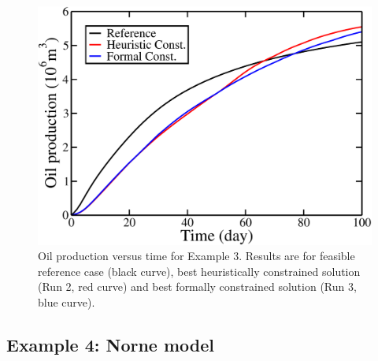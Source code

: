 \documentclass[twocolumn,numbook]{svjour3}          %
\begin{document}


\begin{figure} [ht]
\begin{center}
\includegraphics[totalheight=2.2in,angle=0]{vanEssenRevenue.pdf}
\end{center}
\caption{Oil production versus time for Example 3. Results are for
  feasible reference case (black curve), best heuristically constrained solution (Run 2, red curve)
  and best formally constrained solution (Run 3, blue curve).}
\label{fig:VanEssenRevenue}
\end{figure}



\subsection{Example 4: Norne model}
\end{document}
